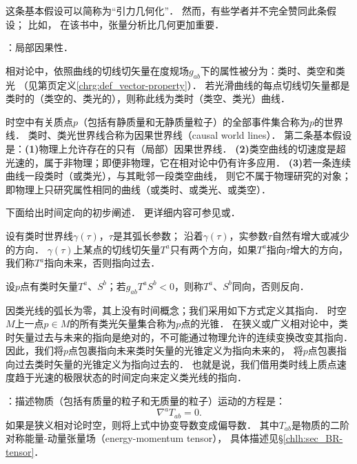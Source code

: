 这条基本假设可以简称为“引力几何化”．
然而，有些学者并不完全赞同此条假设；
比如\textcite[\S 6.9]{weinberg_grav-1972}，
在该书中，张量分析比几何更加重要．

\noindent{}：局部因果性．

相对论中，依照曲线的切线切矢量在度规场$g_{ab}$下的属性被分为：类时、类空和类光
（见第\pageref{chrg:def_vector-property}页定义\ref{chrg:def_vector-property}）．
若光滑曲线的每点切线切矢量都是类时的（类空的、类光的），则称此线为类时（类空、类光）曲线．


时空中有关质点$p$（包括有静质量和无静质量粒子）的全部事件集合称为$p$的{\heiti 世界线}．
类时、类光世界线合称为{\heiti 因果世界线}（causal world lines）．
第二条基本假设是：{\bfseries (1)}物理上允许存在的只有（局部）因果世界线．
{\bfseries (2)}类空曲线的切速度是超光速的，属于非物理；即便非物理，它在相对论中仍有许多应用．
{\bfseries (3)}若一条连续曲线一段类时（或类光），与其毗邻一段类空曲线，
则它不属于物理研究的对象；即物理上只研究属性相同的曲线（或类时、或类光、或类空）．


下面给出时间定向的初步阐述．
更详细内容可参见\parencite[\S 6.1]{hawking-ellis1973}或\parencite[p.143]{oneill1983}．

设有类时世界线$\gamma(\tau)$，$\tau$是其弧长参数；
沿着$\gamma(\tau)$，实参数$\tau$自然有增大或减少的方向．
$\gamma(\tau)$上某点的切线切矢量$T^a$只有两个方向，如果$T^a$指向$\tau$增大的方向，
我们称$T^a${\heiti 指向未来}，否则{\heiti 指向过去}．

设$p$点有类时矢量$T^a$、$S^b$；若$g_{ab}T^a S^b <0$，则称$T^a$、$S^b${\heiti 同向}，否则{\heiti 反向}．


因类光线的弧长为零，其上没有时间概念；我们采用如下方式定义其指向．
时空$M$上一点$p\in M$的所有类光矢量集合称为$p$点的{\heiti 光锥}． %
在狭义或广义相对论中，类时矢量过去与未来的指向是绝对的，不可能通过物理允许的连续变换改变其指向．
因此，我们将$p$点包裹指向未来类时矢量的光锥定义为{\heiti 指向未来}的，
将$p$点包裹指向过去类时矢量的光锥定义为{\heiti 指向过去}的．
也就是说，我们借用类时线上质点速度趋于光速的极限状态的时间定向来定义类光线的指向．


\noindent{}：描述物质（包括有质量的粒子和无质量的粒子）运动的方程是：
\begin{equation}\label{chfd:eqn_motion-gr}
    \nabla^a T_{ab} =0.
\end{equation}
如果是狭义相对论时空，则将上式中协变导数变成偏导数．
其中$T_{ab}$是物质的二阶对称能量-动量张量场（energy-momentum tensor），
具体描述见\S\ref{chlh:sec_BR-tensor}．



